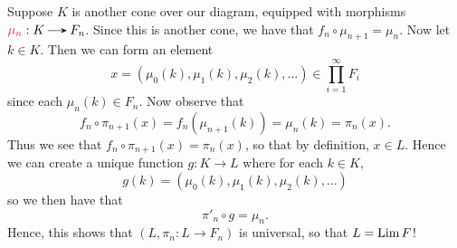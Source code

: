 \begin{example}
    \begin{prf}
        Suppose $K$ is another cone over our diagram, 
        equipped with morphisms $\textcolor{Red}{\mu_n}: K \to
        F_n$. Since this is another 
        cone, we have that $f_n \circ \mu_{n+1} = \mu_n$. 
        Now let $k \in K$.  Then we can form an element 
        \[
            x = (\mu_0(k), \mu_1(k), \mu_2(k), \dots) \in 
            \prod_{i = 1}^{\infty}F_i
        \]  
        since each $\mu_n(k) \in F_n$. Now observe that 
        \[
            f_n \circ \pi_{n+1}(x) = f_n(\mu_{n+1}(k)) = 
            \mu_n(k) = \pi_n(x). 
        \]
        Thus we see that $f_n \circ \pi_{n+1}(x) = \pi_n(x)$, so that
        by definition,  $x \in L$. Hence we can create a unique
        function $g: K \to L$ where for each $k \in K$,
        \[
            g(k) = (\mu_0(k), \mu_1(k), \mu_2(k), \dots)
        \]
        so we then have that 
        \[
            \pi'_n \circ g = \mu_n.
        \]
        Hence, this shows that $(L, \pi_n: L \to F_n)$ is universal,
        so that $L = \operatorname*{\mathrm{Lim }} F$! 
        \begin{center}
        \end{center}

    \end{prf}
        

\end{example}
